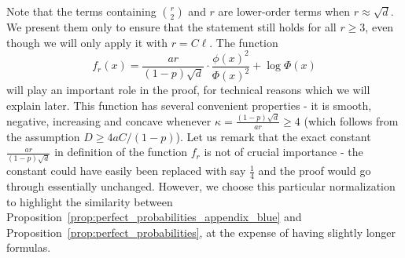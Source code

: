 \documentclass[11pt]{amsart}
\theoremstyle{definition}
\begin{document}
Note that the terms containing $\binom{r}{2}$ and $r$ are lower-order terms when $r\approx \sqrt{d}$. We present them only to ensure that the statement still holds for all $r\geq 3$, even though we will only apply it with $r=C\ell$. 
The function 
{\smaller[0.3]
\[
f_r(x)=\frac{ar}{(1-p)\sqrt{d}}\cdot \frac{\phi(x)^2}{\Phi(x)^2}+\log\Phi(x)
\]
}
will play an important role in the proof, for technical reasons which we will explain later. This function has several convenient properties - it is smooth, negative, increasing and concave whenever $\kappa=\frac{(1-p)\sqrt d}{ar}\geq 4$ (which follows from the assumption $D\geq 4aC/(1-p)$). Let us remark that the exact constant $\frac{ar}{(1-p)\sqrt d}$ in definition of the function $f_r$ is not of crucial importance - the constant could have easily been replaced with say $\frac{1}{4}$ and the proof would go through essentially unchanged. However, we choose this particular normalization to highlight the similarity between Proposition~\ref{prop:perfect_probabilities_appendix_blue} and Proposition~\ref{prop:perfect_probabilities}, at the expense of having slightly longer formulas.
\end{document}
